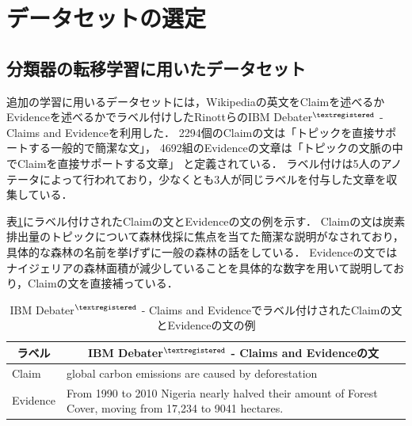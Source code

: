 \documentclass[12pt,a4j]{jreport}
\begin{document}

\section{データセットの選定}
\label{section_select_dataset}

\subsection{分類器の転移学習に用いたデータセット}
追加の学習に用いるデータセットには，Wikipediaの英文をClaimを述べるかEvidenceを述べるかでラベル付けしたRinottらのIBM Debater$^{\textregistered}$ - Claims and Evidenceを利用した\cite{rinott_show_2015}．
2294個のClaimの文は「トピックを直接サポートする一般的で簡潔な文」，
4692組のEvidenceの文章は「トピックの文脈の中でClaimを直接サポートする文章」
と定義されている．
ラベル付けは5人のアノテータによって行われており，少なくとも3人が同じラベルを付与した文章を収集している．

表\ref{claim_evidence_example}にラベル付けされたClaimの文とEvidenceの文の例を示す．
Claimの文は炭素排出量のトピックについて森林伐採に焦点を当てた簡潔な説明がなされており，具体的な森林の名前を挙げずに一般の森林の話をしている．
Evidenceの文ではナイジェリアの森林面積が減少していることを具体的な数字を用いて説明しており，Claimの文を直接補っている．

\begin{table}[H]
  \caption{IBM Debater$^{\textregistered}$ - Claims and Evidenceでラベル付けされたClaimの文とEvidenceの文の例}
  \vspace{4mm}
  \centering
  \begin{tabular}{lp{12.3cm}}
    \hline
    \multicolumn{1}{c}{ラベル} & \multicolumn{1}{c}{IBM Debater$^{\textregistered}$ - Claims and Evidenceの文}
    \\
    \hline
    Claim & global carbon emissions are caused by deforestation
    \\
    Evidence & \baselineskip=16pt
    From 1990 to 2010 Nigeria nearly halved their amount of Forest Cover, moving from 17,234 to 9041 hectares.
    \\[0.5mm]
    \hline
  \end{tabular}
  \label{claim_evidence_example}
\end{table}
\end{document}
